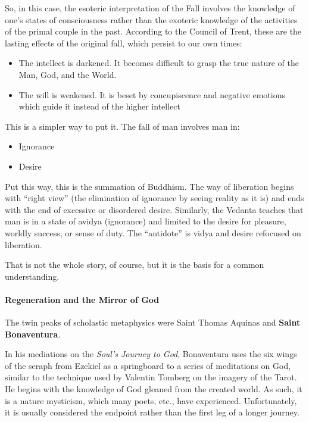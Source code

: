 So, in this case, the esoteric interpretation of the Fall involves the knowledge of one's states of consciousness rather than the exoteric knowledge of the activities of the primal couple in the past. According to the Council of Trent, these are the lasting effects of the original fall, which persist to our own times:

\begin{itemize}
\item The intellect is darkened. It becomes difficult to grasp the true nature of the Man, God, and the World.

\item The will is weakened. It is beset by concupiscence and negative emotions which guide it instead of the higher intellect
\end{itemize}


This is a simpler way to put it. The fall of man involves man in:

\begin{itemize}


\item Ignorance

\item Desire
\end{itemize}


Put this way, this is the summation of Buddhism. The way of liberation begins with ``right view'' (the elimination of ignorance by seeing reality as it is) and ends with the end of excessive or disordered desire. Similarly, the Vedanta teaches that man is in a state of avidya (ignorance) and limited to the desire for pleasure, worldly success, or sense of duty. The ``antidote'' is vidya and desire refocused on liberation.

That is not the whole story, of course, but it is the basis for a common understanding.

\paragraph{Regeneration and the Mirror of God}


The twin peaks of scholastic metaphysics were Saint Thomas Aquinas and \textbf{Saint Bonaventura}.

In his mediations on the \textit{Soul's Journey to God}, Bonaventura uses the six wings of the seraph from Ezekiel as a springboard to a series of meditations on God, similar to the technique used by Valentin Tomberg on the imagery of the Tarot. He begins with the knowledge of God gleaned from the created world. As such, it is a nature mysticism, which many poets, etc., have experienced. Unfortunately, it is usually considered the endpoint rather than the first leg of a longer journey.

